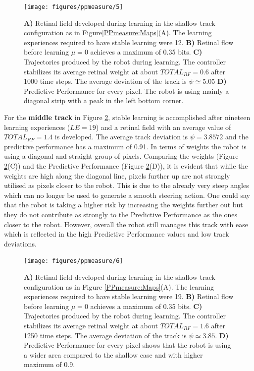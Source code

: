 \begin{figure}[!hbt]
	\begin{center}
	\texttt{[image: figures/ppmeasure/5]}
	\end{center}
	\caption[Performance for the shallow track]{
	{\bf A)} Retinal field developed during learning in the shallow track configuration as in Figure\ref{PPmeasure:Maps}(A).
		      The learning experiences required to have stable learning were 12.
	{\bf B)} Retinal flow before learning $\mu=0$ achieves a maximum of 0.35 bits. 
	{\bf C)} Trajectories produced by the robot during learning. The controller stabilizes its average retinal weight at about $TOTAL_{RF}=0.6$ after 1000 time steps. The average deviation of the track is $\psi \simeq 5.05$  
	{\bf D)} Predictive Performance for every pixel. The robot is using mainly a diagonal strip with a peak in the left bottom corner. \label{PPmeasure:shallow}}
\end{figure}

For the \textbf{middle track} in Figure \ref{PPmeasure:middle}, stable learning is accomplished
after nineteen learning experiences ($LE=19$) and a retinal field
with an average value of $TOTAL_{RF}=1.4$ is developed.
The average track deviation is $\psi=3.8572$ and the predictive performance has a
maximum of 0.91.
In terms of weights the robot is using a diagonal and straight group of pixels.
Comparing the weights (Figure \ref{PPmeasure:middle}(C)) and the
Predictive Performance (Figure \ref{PPmeasure:middle}(D)),
it is evident that while the weights are high along the diagonal line, pixels further up
are not strongly utilised as pixels closer to the robot.
This is due to the already very steep angles which can no
longer be used to generate a smooth steering action. One could say that the
robot is taking a higher risk by increasing the weights further out but they do
not contribute as strongly to the Predictive Performance as the ones closer to
the robot. However, overall the robot still manages this track with ease which is
reﬂected in the high Predictive Performance values and low track deviations.

\begin{figure}[!hbt]
	\begin{center}
		\texttt{[image: figures/ppmeasure/6]}
	\end{center}
	\caption[Performance for the intermediate track]{
	{\bf A)} Retinal field developed during learning in the shallow track configuration as in Figure \ref{PPmeasure:Maps}(A).
		      The learning experiences required to have stable learning were 19.
	{\bf B)} Retinal flow before learning $\mu=0$ achieves a maximum of 0.35 bits. 
	{\bf C)} Trajectories produced by the robot during learning. The controller stabilizes its average retinal weight at about $TOTAL_{RF}=1.6$ after 1250 time steps. The average deviation of the track is $\psi \simeq 3.85$.  
	{\bf D)} Predictive Performance for every pixel shows that the robot is using a wider area compared to the shallow case and with higher maximum of 0.9. \label{PPmeasure:middle}}
\end{figure}


